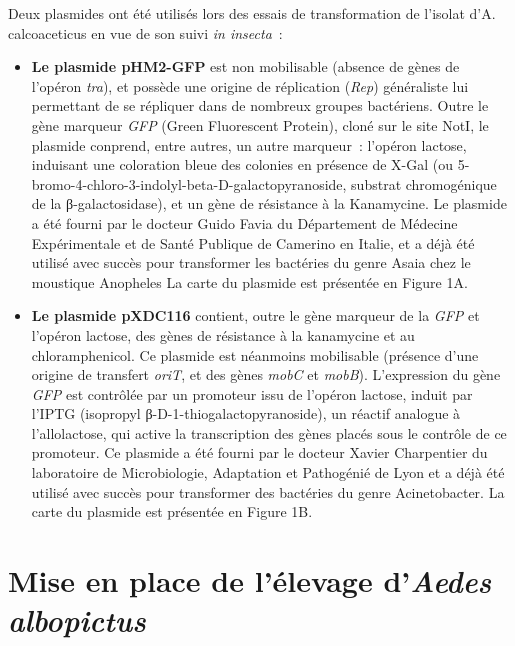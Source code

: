 Deux plasmides ont été utilisés lors des essais de transformation de l'isolat d'A. calcoaceticus en vue de son suivi \textit{in insecta}~:
\begin{itemize}
\item \textbf{Le plasmide pHM2-GFP} est non mobilisable (absence de gènes de l'opéron \textit{tra}), et possède une origine de réplication (\textit{Rep}) généraliste lui permettant de se répliquer dans de nombreux groupes bactériens.
Outre le gène marqueur \textit{GFP} (Green Fluorescent Protein), cloné sur le site NotI, le plasmide conprend, entre autres, un autre marqueur~: l'opéron lactose, induisant une coloration bleue des colonies en présence de X-Gal (ou 5-bromo-4-chloro-3-indolyl-beta-D-galactopyranoside, substrat chromogénique de la β-galactosidase), et un gène de résistance à la Kanamycine.
Le plasmide a été fourni par le docteur Guido Favia du Département de Médecine Expérimentale et de Santé Publique de Camerino en Italie, et a déjà été utilisé avec succès pour transformer les bactéries du genre Asaia chez le moustique Anopheles \cite{favia2007}
La carte du plasmide est présentée en Figure 1A.

\item \textbf{Le plasmide pXDC116} contient, outre le gène marqueur de la \textit{GFP} et l'opéron lactose, des gènes de résistance à la kanamycine et au chloramphenicol. Ce plasmide est néanmoins mobilisable (présence d'une origine de transfert \textit{oriT}, et des gènes \textit{mobC} et \textit{mobB}).
L'expression du gène \textit{GFP} est contrôlée par un promoteur issu de l'opéron lactose, induit par l'IPTG (isopropyl β-D-1-thiogalactopyranoside), un réactif analogue à l'allolactose, qui active la transcription des gènes placés sous le contrôle de ce promoteur.
Ce plasmide a été fourni par le docteur Xavier Charpentier du laboratoire de Microbiologie, Adaptation et Pathogénié de Lyon et a déjà été utilisé avec succès pour transformer des bactéries du genre Acinetobacter. La carte du plasmide est présentée en Figure 1B.

\end{itemize}


\section{Mise en place de l'élevage d'\textit{Aedes albopictus}}

